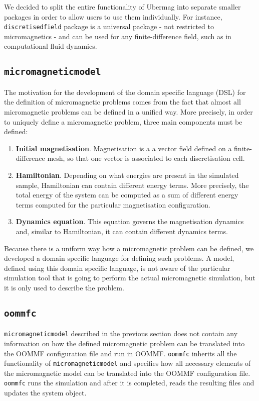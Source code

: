 \documentclass{deliverablereport}
\begin{document}
We decided to split the entire functionality of Ubermag into separate smaller packages in order to allow users to use them individually. For instance, \texttt{discretisedfield} package is a universal package - not restricted to micromagnetics - and can be used for any finite-difference field, such as in computational fluid dynamics. 

\subsection{\texttt{micromagneticmodel}}\label{sec:micromagneticmodel}

The motivation for the development of the domain specific language (DSL) for the definition of micromagnetic problems comes from the fact that almost all micromagnetic problems can be defined in a unified way. More precisely, in order to uniquely define a micromagnetic problem, three main components must be defined:

\begin{enumerate}
\item \textbf{Initial magnetisation}. Magnetisation is a a vector field defined on a finite-difference mesh, so that one vector is associated to each discretisation cell.
\item \textbf{Hamiltonian}. Depending on what energies are present in the simulated sample, Hamiltonian can contain different energy terms. More precisely, the total energy of the system can be computed as a sum of different energy terms computed for the particular magnetisation configuration.
\item \textbf{Dynamics equation}. This equation governs the magnetisation dynamics and, similar to Hamiltonian, it can contain different dynamics terms.
\end{enumerate}

Because there is a uniform way how a micromagnetic problem can be defined, we developed a domain specific language for defining such problems. A model, defined using this domain specific language, is not aware of the particular simulation tool that is going to perform the actual micromagnetic simulation, but it is only used to describe the problem.

\subsection{\texttt{oommfc}}\label{sec:oommfc}

\texttt{micromagneticmodel} described in the previous section does not contain any information on how the defined micromagnetic problem can be translated into the OOMMF configuration file and run in OOMMF. \texttt{oommfc} inherits all the functionality of \texttt{micromagneticmodel} and specifies how all necessary elements of the micromagnetic model can be translated into the OOMMF configuration file. \texttt{oommfc} runs the simulation and after it is completed, reads the resulting files and updates the system object.
\end{document}
